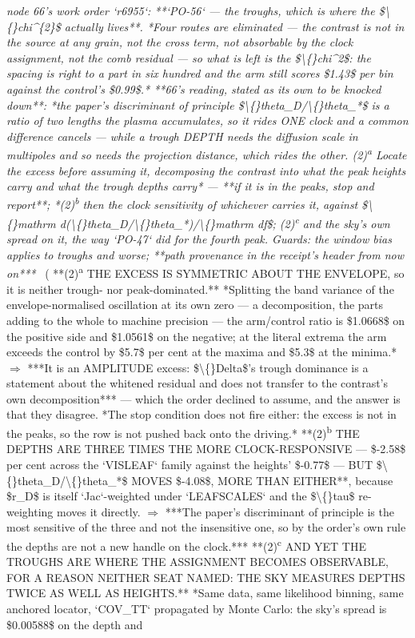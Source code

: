 \begin{description}
\textit{node 66's work order `r6955`: **`PO-56` --- the troughs, which is where the \$\textbackslash\{\}chi\textasciicircum{}\{2\}\$ actually lives**. *Four routes are eliminated --- the contrast is not in the source at any grain, not the cross term, not absorbable by the clock assignment, not the comb residual --- so what is left is the \$\textbackslash\{\}chi\textasciicircum{}2\$: the spacing is right to a part in six hundred and the arm still scores \$1.43\$ per bin against the control's \$0.99\$.* **66's reading, stated as its own to be knocked down**: *the paper's discriminant of principle \$\textbackslash\{\}theta\_D/\textbackslash\{\}theta\_*\$ is a ratio of two lengths the plasma accumulates, so it rides ONE clock and a common difference cancels --- while a trough DEPTH needs the diffusion scale in multipoles and so needs the projection distance, which rides the other. (2)\textsuperscript{a} Locate the excess before assuming it, decomposing the contrast into what the peak heights carry and what the trough depths carry* --- **if it is in the peaks, stop and report**; *(2)\textsuperscript{b} then the clock sensitivity of whichever carries it, against \$\textbackslash\{\}mathrm d(\textbackslash\{\}theta\_D/\textbackslash\{\}theta\_*)/\textbackslash\{\}mathrm df\$; (2)\textsuperscript{c} and the sky's own spread on it, the way `PO-47` did for the fourth peak. Guards: the window bias applies to troughs and worse; **path provenance in the receipt's header from now on***} \ ( **(2)\textsuperscript{a} THE EXCESS IS SYMMETRIC ABOUT THE ENVELOPE, so it is neither trough- nor peak-dominated.** *Splitting the band variance of the envelope-normalised oscillation at its own zero --- a decomposition, the parts adding to the whole to machine precision --- the arm/control ratio is \$1.0668\$ on the positive side and \$1.0561\$ on the negative; at the literal extrema the arm exceeds the control by \$5.7\$ per cent at the maxima and \$5.3\$ at the minima.* \ensuremath{\Rightarrow} ***It is an AMPLITUDE excess: \$\textbackslash\{\}Delta\$'s trough dominance is a statement about the whitened residual and does not transfer to the contrast's own decomposition*** --- which the order declined to assume, and the answer is that they disagree. *The stop condition does not fire either: the excess is not in the peaks, so the row is not pushed back onto the driving.*  **(2)\textsuperscript{b} THE DEPTHS ARE THREE TIMES THE MORE CLOCK-RESPONSIVE --- \$-2.58\$ per cent across the `VISLEAF` family against the heights' \$-0.77\$ --- BUT \$\textbackslash\{\}theta\_D/\textbackslash\{\}theta\_*\$ MOVES \$-4.08\$, MORE THAN EITHER**, because \$r\_D\$ is itself `Jac`-weighted under `LEAFSCALES` and the \$\textbackslash\{\}tau\$ re-weighting moves it directly. \ensuremath{\Rightarrow} ***The paper's discriminant of principle is the most sensitive of the three and not the insensitive one, so by the order's own rule the depths are not a new handle on the clock.***  **(2)\textsuperscript{c} AND YET THE TROUGHS ARE WHERE THE ASSIGNMENT BECOMES OBSERVABLE, FOR A REASON NEITHER SEAT NAMED: THE SKY MEASURES DEPTHS TWICE AS WELL AS HEIGHTS.** *Same data, same likelihood binning, same anchored locator, `COV\_TT` propagated by Monte Carlo: the sky's spread is \$0.00588\$ on the depth and 
\end{description}
